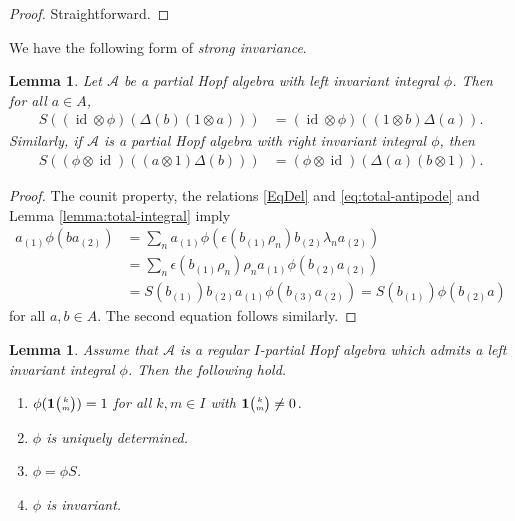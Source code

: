 \documentclass[10pt]{article}
\DeclareMathOperator{\id}{id}
\newcommand{\Grt}[3]{#1{\tiny{\begin{pmatrix} #2\\#3\end{pmatrix}}}}
\newcommand{\UnitC}[2]{\Grt{\mathbf{1}}{#1}{#2}}
\newtheorem{Lem}[Theorem]{Lemma}
\theoremstyle{definition}
\numberwithin{equation}{section}
\begin{document}
\begin{proof}
  Straightforward.
\end{proof}

We have the following form of \emph{strong invariance}.

\begin{Lem} \label{lemma:strong-invariance}
  Let $\mathscr{A}$ be a partial Hopf algebra with left invariant integral $\phi$. Then
  for all $a\in A$,
  \begin{align*}
    S\left(( \id\otimes
    \phi)(\Delta(b)(1 \otimes a))\right) &= (\id \otimes \phi)((1 \otimes b)\Delta(a)).
  \end{align*}
  Similarly, if $\mathscr{A}$ is a partial Hopf algebra with right invariant integral $\phi$, then 
   \begin{align*} S\left((\phi \otimes
    \id)((a\otimes 1)\Delta(b))\right) &= (\phi \otimes \id)(\Delta(a)(b\otimes 1)).\end{align*}
\end{Lem}
\begin{proof}
 The counit property, the relations \eqref{EqDel} and
 \eqref{eq:total-antipode} and Lemma \ref{lemma:total-integral} imply
  \begin{align*}
    a_{(1)}\phi(ba_{(2)}) &= \sum_{n}
    a_{(1)}\phi(\epsilon(b_{(1)}\rho_{n})b_{(2)}\lambda_{n}a_{(2)}) \\
&= \sum_{n} \epsilon(b_{(1)}\rho_{n})\rho_{n}a_{(1)}\phi(b_{(2)}a_{(2)})
\\
&= S(b_{(1)})b_{(2)}a_{(1)}\phi(b_{(3)}a_{(2)}) =
S(b_{(1)})\phi(b_{(2)}a)
  \end{align*}
for all $a,b \in A$. The second equation 
follows similarly.
\end{proof}

\begin{Lem} Assume that $\mathscr{A}$ is a regular  $I$-partial Hopf algebra which admits a left invariant integral $\phi$. Then the following hold.
\begin{enumerate}[label = {(\arabic*)}]
\item\label{LI1} $\phi(\UnitC{k}{m})=1$ for all $k,m\in I$ with $\UnitC{k}{m}\neq 0$.
\item\label{LI2} $\phi$ is uniquely determined.
\item\label{LI3} $\phi=\phi S$.
\item\label{LI4} $\phi$ is invariant.
\end{enumerate}
\end{Lem}
\end{document}
